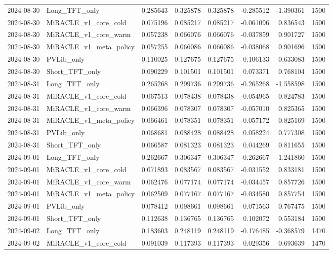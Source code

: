 \begin{tabular}{llrrrrrr}
2024-08-30 & Long_TFT_only & 0.285643 & 0.325878 & 0.325878 & -0.285512 & -1.390361 & 1500 \\
2024-08-30 & MiRACLE_v1_core_cold & 0.075196 & 0.085217 & 0.085217 & -0.061096 & 0.836543 & 1500 \\
2024-08-30 & MiRACLE_v1_core_warm & 0.057238 & 0.066076 & 0.066076 & -0.037859 & 0.901727 & 1500 \\
2024-08-30 & MiRACLE_v1_meta_policy & 0.057255 & 0.066086 & 0.066086 & -0.038068 & 0.901696 & 1500 \\
2024-08-30 & PVLib_only & 0.110025 & 0.127675 & 0.127675 & 0.106133 & 0.633083 & 1500 \\
2024-08-30 & Short_TFT_only & 0.090229 & 0.101501 & 0.101501 & 0.073371 & 0.768104 & 1500 \\
2024-08-31 & Long_TFT_only & 0.265268 & 0.299736 & 0.299736 & -0.265268 & -1.558598 & 1500 \\
2024-08-31 & MiRACLE_v1_core_cold & 0.067513 & 0.078438 & 0.078438 & -0.054965 & 0.824783 & 1500 \\
2024-08-31 & MiRACLE_v1_core_warm & 0.066396 & 0.078307 & 0.078307 & -0.057010 & 0.825365 & 1500 \\
2024-08-31 & MiRACLE_v1_meta_policy & 0.066461 & 0.078351 & 0.078351 & -0.057172 & 0.825169 & 1500 \\
2024-08-31 & PVLib_only & 0.068681 & 0.088428 & 0.088428 & 0.058224 & 0.777308 & 1500 \\
2024-08-31 & Short_TFT_only & 0.066587 & 0.081323 & 0.081323 & 0.044269 & 0.811655 & 1500 \\
2024-09-01 & Long_TFT_only & 0.262667 & 0.306347 & 0.306347 & -0.262667 & -1.241860 & 1500 \\
2024-09-01 & MiRACLE_v1_core_cold & 0.071893 & 0.083567 & 0.083567 & -0.031552 & 0.833181 & 1500 \\
2024-09-01 & MiRACLE_v1_core_warm & 0.062476 & 0.077174 & 0.077174 & -0.034457 & 0.857726 & 1500 \\
2024-09-01 & MiRACLE_v1_meta_policy & 0.062509 & 0.077167 & 0.077167 & -0.034580 & 0.857754 & 1500 \\
2024-09-01 & PVLib_only & 0.078412 & 0.098661 & 0.098661 & 0.071563 & 0.767475 & 1500 \\
2024-09-01 & Short_TFT_only & 0.112638 & 0.136765 & 0.136765 & 0.102072 & 0.553184 & 1500 \\
2024-09-02 & Long_TFT_only & 0.183603 & 0.248119 & 0.248119 & -0.176485 & -0.368579 & 1470 \\
2024-09-02 & MiRACLE_v1_core_cold & 0.091039 & 0.117393 & 0.117393 & 0.029356 & 0.693639 & 1470 \\

\end{tabular}
